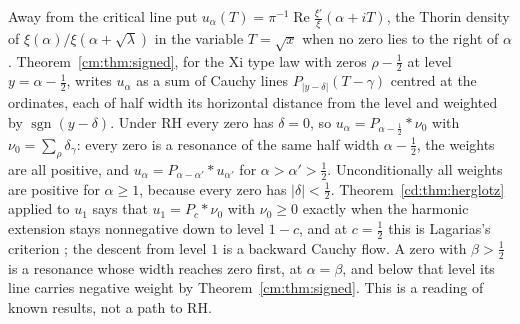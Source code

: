 \begin{remark}\label{ev:rem:bw}
Away from the critical line put $u_\alpha(T)=\pi^{-1}\operatorname{Re}\frac{\xi'}{\xi}(\alpha+iT)$, the Thorin density of $\xi(\alpha)/\xi(\alpha+\sqrt\lambda)$ in the variable $T=\sqrt x$ when no zero lies to the right of $\alpha$. Theorem~\ref{cm:thm:signed}, for the Xi type law with zeros $\rho-\tfrac12$ at level $y=\alpha-\tfrac12$, writes $u_\alpha$ as a sum of Cauchy lines $P_{|y-\delta|}(T-\gamma)$ centred at the ordinates, each of half width its horizontal distance from the level and weighted by $\operatorname{sgn}(y-\delta)$. Under RH every zero has $\delta=0$, so $u_\alpha=P_{\alpha-\frac12}*\nu_0$ with $\nu_0=\sum_\rho\delta_\gamma$: every zero is a resonance of the same half width $\alpha-\tfrac12$, the weights are all positive, and $u_\alpha=P_{\alpha-\alpha'}*u_{\alpha'}$ for $\alpha>\alpha'>\tfrac12$. Unconditionally all weights are positive for $\alpha\ge1$, because every zero has $|\delta|<\tfrac12$. Theorem~\ref{cd:thm:herglotz} applied to $u_1$ says that $u_1=P_c*\nu_0$ with $\nu_0\ge0$ exactly when the harmonic extension stays nonnegative down to level $1-c$, and at $c=\tfrac12$ this is Lagarias's criterion \cite{Lagarias}; the descent from level $1$ is a backward Cauchy flow. A zero with $\beta>\tfrac12$ is a resonance whose width reaches zero first, at $\alpha=\beta$, and below that level its line carries negative weight by Theorem~\ref{cm:thm:signed}. This is a reading of known results, not a path to RH.
\end{remark}
